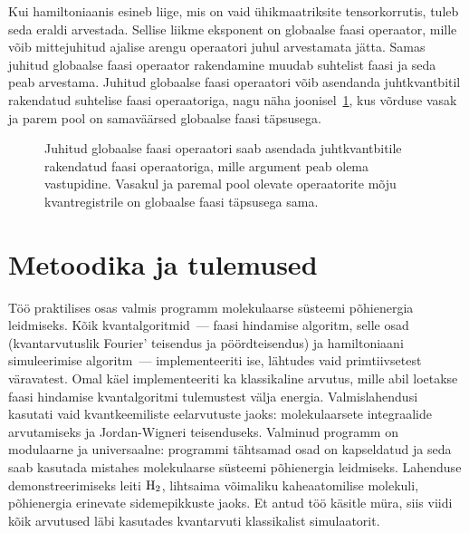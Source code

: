 \documentclass[12pt]{report}
\begin{document}
Kui hamiltoniaanis esineb liige, mis on vaid ühikmaatriksite tensorkorrutis, tuleb seda eraldi arvestada.
Sellise liikme eksponent on globaalse faasi operaator, mille võib mittejuhitud ajalise arengu operaatori juhul arvestamata jätta.
Samas juhitud globaalse faasi operaator rakendamine muudab suhtelist faasi ja seda peab arvestama.
Juhitud globaalse faasi operaatori võib asendanda juhtkvantbitil rakendatud suhtelise faasi operaatoriga, nagu näha joonisel~\ref{fig:globphase}, kus võrduse vasak ja parem pool on samaväärsed globaalse faasi täpsusega.

\begin{figure}[h]
    \centering
    \ifdefined\yquanton
    \fi
    \caption{Juhitud globaalse faasi operaatori saab asendada juhtkvantbitile rakendatud faasi operaatoriga, mille argument peab olema vastupidine. Vasakul ja paremal pool olevate operaatorite mõju kvantregistrile on globaalse faasi täpsusega sama.}
    \label{fig:globphase}
\end{figure}

\chapter{Metoodika ja tulemused}

Töö praktilises osas valmis programm molekulaarse süsteemi põhienergia leidmiseks.
Kõik kvantalgoritmid~--- faasi hindamise algoritm, selle osad (kvantarvutuslik Fourier' teisendus ja pöördteisendus) ja hamiltoniaani simuleerimise algoritm~--- implementeeriti ise, lähtudes vaid primtiivsetest väravatest.
Omal käel implementeeriti ka klassikaline arvutus, mille abil loetakse faasi hindamise kvantalgoritmi tulemustest välja energia.
Valmislahendusi kasutati vaid kvantkeemiliste eelarvutuste jaoks: molekulaarsete integraalide arvutamiseks ja Jordan-Wigneri teisenduseks.
Valminud programm on modulaarne ja universaalne: programmi tähtsamad osad on kapseldatud ja seda saab kasutada mistahes molekulaarse süsteemi põhienergia leidmiseks.
Lahenduse demonstreerimiseks leiti \(\rm H_2\), lihtsaima võimaliku kaheaatomilise molekuli, põhienergia erinevate sidemepikkuste jaoks.
Et antud töö käsitle müra, siis viidi kõik arvutused läbi kasutades kvantarvuti klassikalist simulaatorit.
\end{document}
